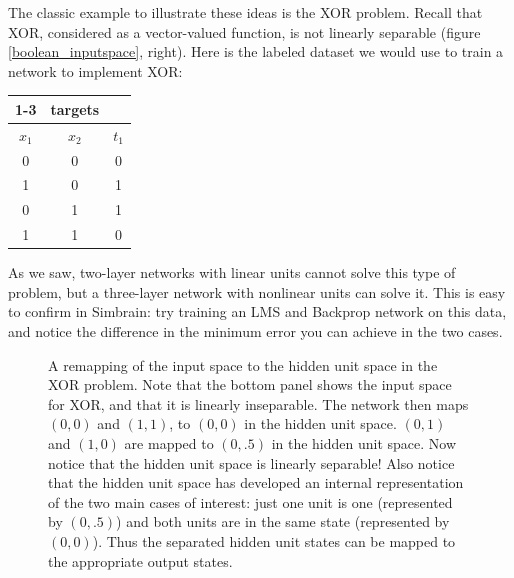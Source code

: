 The classic example to illustrate these ideas is the XOR problem. Recall that XOR, considered as a vector-valued function, is not linearly separable (figure \ref{boolean_inputspace}, right). Here is the labeled dataset we would use to train a network to implement XOR:
\begin{center}
\begin{tabular}{| c | c || c | }
\cline{1-3}
\multicolumn{2}{| c || }{inputs}
 & \multicolumn{1}{c|}{targets} \\
\hline
  $x_1$  & $x_2$ & $t_1$  \\
\hline
  0 & 0 & 0  \\
\hline
 1 & 0 & 1  \\
\hline
 0 & 1 & 1 \\
\hline
1 & 1 & 0 \\
\hline
\end{tabular}
\end{center}
As we saw, two-layer networks with linear units cannot solve this type of problem, but a three-layer network with nonlinear units can solve it. This is easy to confirm in Simbrain: try training an LMS and Backprop network on this data, and notice the difference in the minimum error you can achieve in the two cases. %

\begin{figure}[h]
\centering
{}
\caption[Pamela Payne.]{A remapping of the input space to the hidden unit space in the XOR problem. Note that the bottom panel shows the input space for XOR, and that it is linearly inseparable. The network then maps $(0,0)$ and $(1,1)$,  to $(0,0)$ in the hidden unit space. $(0,1)$ and $(1,0)$ are mapped to $(0,.5)$ in the hidden unit space. Now notice that the hidden unit space is linearly separable!  Also notice that the hidden unit space has developed an internal representation of the two main cases of interest: just one unit is one (represented by $(0,.5)$) and both units are in the same state (represented by $(0,0)$). Thus the separated hidden unit states can be mapped to the appropriate output states.}
\label{xor_remapping}
\end{figure}


